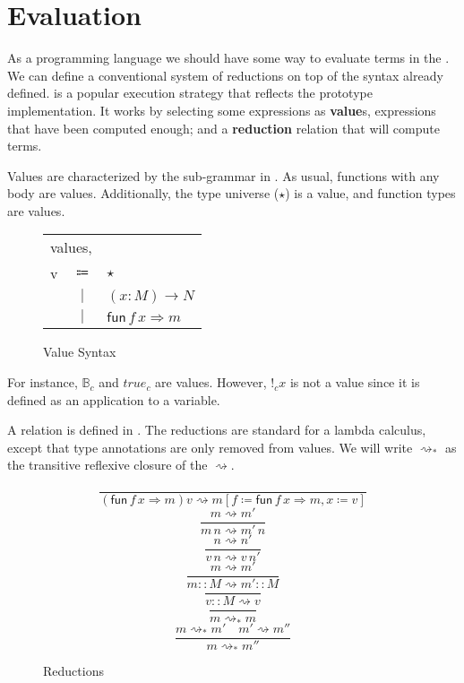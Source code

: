 \section{\SLang{} Evaluation}
As a programming language we should have some way to evaluate terms in the \slang{}.
We can define a conventional \cbv{} system of reductions on top of the syntax already defined.
\Cbv{} is a popular execution strategy that reflects the prototype implementation.
It works by selecting some expressions as \textbf{value}s, expressions that have been computed enough;
 and a \textbf{reduction} relation that will compute terms.
 
Values are characterized by the sub-grammar in .
As usual, functions with any body are values.
Additionally, the type universe ($\star$) is a value, and function types are values.
 
\begin{figure}
\begin{tabular}{lcl}
\multicolumn{3}{l}{values,}\tabularnewline
v & $\Coloneqq$ & $\star$\tabularnewline
 & $|$ & $\left(x:M\right)\rightarrow N$\tabularnewline
 & $|$ & $\mathsf{fun}\,f\,x\Rightarrow m$\tabularnewline
\end{tabular}\caption{\SLang{} Value Syntax}
\label{fig:surface-value-syntax}
\end{figure}
 
For instance, $\mathbb{B}_{c}$  and $true_{c}$ are values. %
However, $!_{c}x$ is not a value since it is defined as an application to a variable.
 
A \cbv{} relation is defined in .
The reductions are standard for a \cbv{} lambda calculus, except that type annotations are only removed from values.
We will write $\rightsquigarrow_{\ast}$ as the transitive reflexive closure of the $\rightsquigarrow$.
 
\begin{figure}
\[
\frac{\,}{\left(\mathsf{fun}\,f\,x\Rightarrow m\right)v\rightsquigarrow m\left[f\coloneqq\mathsf{fun}\,f\,x\Rightarrow m,x\coloneqq v\right]}
\]
\[
\frac{m\rightsquigarrow m'}{m\,n\rightsquigarrow m'\,n}
\]
\[
\frac{n\rightsquigarrow n'}{v\,n\rightsquigarrow v\,n'}
\]
\[
\frac{m\rightsquigarrow m'}{m::M\rightsquigarrow m'::M}
\]
\[
\frac{\,}{v::M\rightsquigarrow v}
\]
\[
\frac{\,}{m\rightsquigarrow_{\ast}m}
\]
\[
\frac{m\rightsquigarrow_{\ast}m'\quad m'\rightsquigarrow m''}{m\rightsquigarrow_{\ast}m''}
\]
 
\caption{\SLang{} \CbV{} Reductions}
\label{fig:surface-reduction-step}
\end{figure}
 
